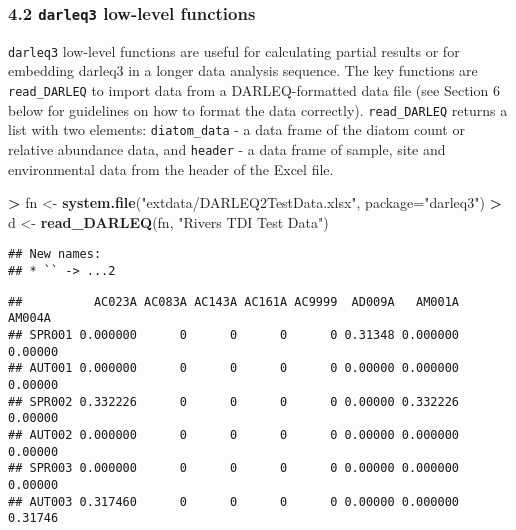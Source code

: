 \documentclass[
]{article}
\newenvironment{Shaded}{\begin{snugshade}}{\end{snugshade}}
\newcommand{\DataTypeTok}[1]{\textcolor[rgb]{0.13,0.29,0.53}{#1}}
\newcommand{\DecValTok}[1]{\textcolor[rgb]{0.00,0.00,0.81}{#1}}
\newcommand{\KeywordTok}[1]{\textcolor[rgb]{0.13,0.29,0.53}{\textbf{#1}}}
\newcommand{\NormalTok}[1]{#1}
\newcommand{\OperatorTok}[1]{\textcolor[rgb]{0.81,0.36,0.00}{\textbf{#1}}}
\newcommand{\StringTok}[1]{\textcolor[rgb]{0.31,0.60,0.02}{#1}}
\begin{document}
\hypertarget{darleq3-low-level-functions}{%
\subsubsection{\texorpdfstring{4.2 \texttt{darleq3} low-level
functions}{4.2 darleq3 low-level functions}}\label{darleq3-low-level-functions}}

\texttt{darleq3} low-level functions are useful for calculating partial
results or for embedding darleq3 in a longer data analysis sequence. The
key functions are \texttt{read\_DARLEQ} to import data from a
DARLEQ-formatted data file (see Section 6 below for guidelines on how to
format the data correctly). \texttt{read\_DARLEQ} returns a list with
two elements: \texttt{diatom\_data} - a data frame of the diatom count
or relative abundance data, and \texttt{header} - a data frame of
sample, site and environmental data from the header of the Excel file.

\begin{Shaded}
\begin{Highlighting}[]
\OperatorTok{>}\StringTok{ }\NormalTok{fn <-}\StringTok{ }\KeywordTok{system.file}\NormalTok{(}\StringTok{"extdata/DARLEQ2TestData.xlsx"}\NormalTok{, }\DataTypeTok{package=}\StringTok{"darleq3"}\NormalTok{)}
\OperatorTok{>}\StringTok{ }\NormalTok{d <-}\StringTok{ }\KeywordTok{read_DARLEQ}\NormalTok{(fn, }\StringTok{"Rivers TDI Test Data"}\NormalTok{)}
\end{Highlighting}
\end{Shaded}

\begin{verbatim}
## New names:
## * `` -> ...2
\end{verbatim}

\begin{Shaded}
\end{Shaded}

\begin{verbatim}
##          AC023A AC083A AC143A AC161A AC9999  AD009A   AM001A  AM004A
## SPR001 0.000000      0      0      0      0 0.31348 0.000000 0.00000
## AUT001 0.000000      0      0      0      0 0.00000 0.000000 0.00000
## SPR002 0.332226      0      0      0      0 0.00000 0.332226 0.00000
## AUT002 0.000000      0      0      0      0 0.00000 0.000000 0.00000
## SPR003 0.000000      0      0      0      0 0.00000 0.000000 0.00000
## AUT003 0.317460      0      0      0      0 0.00000 0.000000 0.31746
\end{verbatim}
\end{document}

